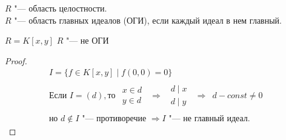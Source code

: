 \begin{Def}
	$R$ "--- область целостности.\\
	$R$ "--- область главных идеалов (ОГИ), если каждый идеал в нем главный.
\end{Def}

\begin{exmp}
	$R = K\left[x, y\right]$ $R$ "--- не ОГИ
	\begin{proof}
		\begin{gather*}
			I = \{f \in K\left[x,y\right] \mid f\left(0,0\right) = 0\} \\
			\text{Если } I = \left(d\right), \text{то}
			\begin{array}{rcccl}
				\begin{array}{c} x \in d \\ y \in d \end{array}
				& \Rightarrow & 
				\begin{array}{c} d \mid x \\ d \mid y \end{array}
				& \Rightarrow & 
				d - const \neq 0
			\end{array} \\
			\text{но } d \notin I  \text{ "--- противоречие } \Rightarrow I \text{ "--- не главный идеал.}
		\end{gather*}
	\end{proof}
\end{exmp}

